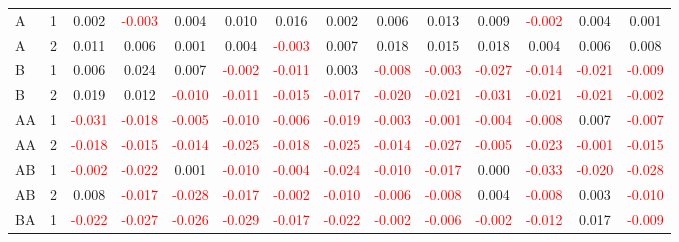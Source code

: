 \begin{table}[H]
{\begin{tabular}{llcccccccccccc}
A & 1 & 0.002 & \textcolor{red}{-0.003} & 0.004 & 0.010 & 0.016 & 0.002 & 0.006 & 0.013 & 0.009 & \textcolor{red}{-0.002} & 0.004 & 0.001\\
A & 2 & 0.011 & 0.006 & 0.001 & 0.004 & \textcolor{red}{-0.003} & 0.007 & 0.018 & 0.015 & 0.018 & 0.004 & 0.006 & 0.008\\
B & 1 & 0.006 & 0.024 & 0.007 & \textcolor{red}{-0.002} & \textcolor{red}{-0.011} & 0.003 & \textcolor{red}{-0.008} & \textcolor{red}{-0.003} & \textcolor{red}{-0.027} & \textcolor{red}{-0.014} & \textcolor{red}{-0.021} & \textcolor{red}{-0.009}\\
B & 2 & 0.019 & 0.012 & \textcolor{red}{-0.010} & \textcolor{red}{-0.011} & \textcolor{red}{-0.015} & \textcolor{red}{-0.017} & \textcolor{red}{-0.020} & \textcolor{red}{-0.021} & \textcolor{red}{-0.031} & \textcolor{red}{-0.021} & \textcolor{red}{-0.021} & \textcolor{red}{-0.002}\\
AA & 1 & \textcolor{red}{-0.031} & \textcolor{red}{-0.018} & \textcolor{red}{-0.005} & \textcolor{red}{-0.010} & \textcolor{red}{-0.006} & \textcolor{red}{-0.019} & \textcolor{red}{-0.003} & \textcolor{red}{-0.001} & \textcolor{red}{-0.004} & \textcolor{red}{-0.008} & 0.007 & \textcolor{red}{-0.007}\\
AA & 2 & \textcolor{red}{-0.018} & \textcolor{red}{-0.015} & \textcolor{red}{-0.014} & \textcolor{red}{-0.025} & \textcolor{red}{-0.018} & \textcolor{red}{-0.025} & \textcolor{red}{-0.014} & \textcolor{red}{-0.027} & \textcolor{red}{-0.005} & \textcolor{red}{-0.023} & \textcolor{red}{-0.001} & \textcolor{red}{-0.015}\\
AB & 1 & \textcolor{red}{-0.002} & \textcolor{red}{-0.022} & 0.001 & \textcolor{red}{-0.010} & \textcolor{red}{-0.004} & \textcolor{red}{-0.024} & \textcolor{red}{-0.010} & \textcolor{red}{-0.017} & 0.000 & \textcolor{red}{-0.033} & \textcolor{red}{-0.020} & \textcolor{red}{-0.028}\\
AB & 2 & 0.008 & \textcolor{red}{-0.017} & \textcolor{red}{-0.028} & \textcolor{red}{-0.017} & \textcolor{red}{-0.002} & \textcolor{red}{-0.010} & \textcolor{red}{-0.006} & \textcolor{red}{-0.008} & 0.004 & \textcolor{red}{-0.008} & 0.003 & \textcolor{red}{-0.010}\\
BA & 1 & \textcolor{red}{-0.022} & \textcolor{red}{-0.027} & \textcolor{red}{-0.026} & \textcolor{red}{-0.029} & \textcolor{red}{-0.017} & \textcolor{red}{-0.022} & \textcolor{red}{-0.002} & \textcolor{red}{-0.006} & \textcolor{red}{-0.002} & \textcolor{red}{-0.012} & 0.017 & \textcolor{red}{-0.009}\\

\end{tabular}}
\end{table}

